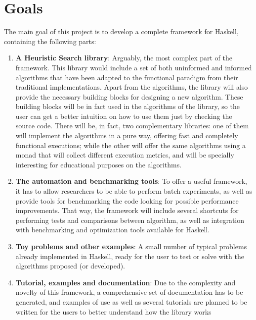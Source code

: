 \section{Goals}

The main goal of this project is to develop a complete framework for Haskell,
containing the following parts:

\begin{enumerate}
\item \textbf{A Heuristic Search library}: Arguably, the most complex part of
  the framework. This library would include a set of both uninformed and
  informed algorithms that have been adapted to the functional paradigm from
  their traditional implementations. Apart from the algorithms, the library
  will also provide the necessary building blocks for designing a new
  algorithm. These building blocks will be in fact used in the algorithms of
  the library, so the user can get a better intuition on how to use them just
  by checking the source code. There will be, in fact, two complementary
  libraries: one of them will implement the algorithms in a pure way, offering
  fast and completely functional executions; while the other will offer the
  same algorithms using a monad that will collect different execution metrics,
  and will be specially interesting for educational purposes on the algorithms.
\item \textbf{The automation and benchmarking tools}: To offer a useful
  framework, it has to allow researchers to be able to perform batch
  experiments, as well as provide tools for benchmarking the code looking for
  possible performance improvements. That way, the framework will include
  several shortcuts for performing tests and comparisons between algorithm, as
  well as integration with benchmarking and optimization tools available for
  Haskell.
\item \textbf{Toy problems and other examples}: A small number of typical
  problems already implemented in Haskell, ready for the user to test or solve
  with the algorithms proposed (or developed).
\item \textbf{Tutorial, examples and documentation}: Due to the complexity and
  novelty of this framework, a comprehensive set of documentation has to be
  generated, and examples of use as well as several tutorials are planned to be
  written for the users to better understand how the library works
\end{enumerate}


\newpage